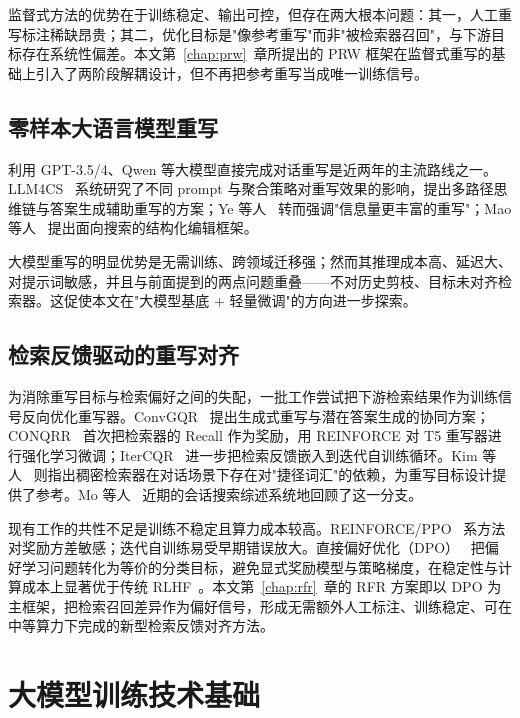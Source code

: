 监督式方法的优势在于训练稳定、输出可控，但存在两大根本问题：其一，人工重写标注稀缺昂贵；其二，优化目标是"像参考重写"而非"被检索器召回"，与下游目标存在系统性偏差。本文第~\ref{chap:prw}~章所提出的 PRW 框架在监督式重写的基础上引入了两阶段解耦设计，但不再把参考重写当成唯一训练信号。

\subsection{零样本大语言模型重写}

利用 GPT-3.5/4、Qwen 等大模型直接完成对话重写是近两年的主流路线之一。LLM4CS~\citep{mao2023llm4cs} 系统研究了不同 prompt 与聚合策略对重写效果的影响，提出多路径思维链与答案生成辅助重写的方案；Ye 等人~\citep{ye2023enhancing} 转而强调"信息量更丰富的重写"；Mao 等人~\citep{mao2023search} 提出面向搜索的结构化编辑框架。

大模型重写的明显优势是无需训练、跨领域迁移强；然而其推理成本高、延迟大、对提示词敏感，并且与前面提到的两点问题重叠——不对历史剪枝、目标未对齐检索器。这促使本文在"大模型基底 + 轻量微调"的方向进一步探索。

\subsection{检索反馈驱动的重写对齐}

为消除重写目标与检索偏好之间的失配，一批工作尝试把下游检索结果作为训练信号反向优化重写器。ConvGQR~\citep{mo2023convgqr} 提出生成式重写与潜在答案生成的协同方案；CONQRR~\citep{wu2022conqrr} 首次把检索器的 Recall 作为奖励，用 REINFORCE 对 T5 重写器进行强化学习微调；IterCQR~\citep{jang2024itercqr} 进一步把检索反馈嵌入到迭代自训练循环。Kim 等人~\citep{kim2022saving} 则指出稠密检索器在对话场景下存在对"捷径词汇"的依赖，为重写目标设计提供了参考。Mo 等人~\citep{mo2024convsar} 近期的会话搜索综述系统地回顾了这一分支。

现有工作的共性不足是训练不稳定且算力成本较高。REINFORCE/PPO~\citep{schulman2017ppo} 系方法对奖励方差敏感；迭代自训练易受早期错误放大。直接偏好优化（DPO）~\citep{rafailov2023direct} 把偏好学习问题转化为等价的分类目标，避免显式奖励模型与策略梯度，在稳定性与计算成本上显著优于传统 RLHF~\citep{ouyang2022traininglanguagemodelsfollow}。本文第~\ref{chap:rfr}~章的 RFR 方案即以 DPO 为主框架，把检索召回差异作为偏好信号，形成无需额外人工标注、训练稳定、可在中等算力下完成的新型检索反馈对齐方法。

\section{大模型训练技术基础}
\label{sec:bg_train}

